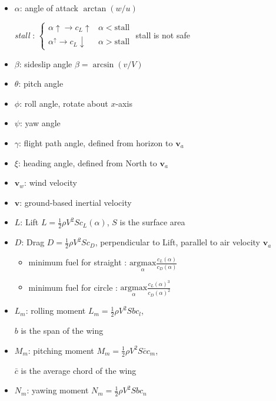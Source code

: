 \documentclass[landscape,a0paper,fontscale=0.285]{baposter} %
\newcommand{\compresslist}{ %
\setlength{\itemsep}{1pt}
\setlength{\parskip}{0pt}
\setlength{\parsep}{0pt}
}
\newcommand{\atan}{\arctan}
\newcommand{\asin}{\arcsin}
\begin{document}
\begin{poster}
{\begin{itemize}
    \item $\alpha$: angle of attack $\atan(w/u)$
    
    \textit{stall} : $\begin{cases}\alpha\uparrow \to c_L\uparrow & \alpha <\text{stall} \\ \alpha^\uparrow  \to c_L\downarrow & \alpha > \text{stall}\end{cases}$ stall is not safe
    \item $\beta$: sideslip angle $\beta = \asin(v/V)$
    \item $\theta$: pitch angle
    \item $\phi$: roll angle, rotate about $x$-axis
    \item $\psi$: yaw angle
    \item $\gamma$: flight path angle, defined from horizon to $\mathbf{v}_a$
    \item $\xi$: heading angle, defined from North to $\mathbf{v}_a$
    \item $\mathbf{v}_w$: wind velocity
    \item $\mathbf{v}$: ground-based inertial velocity
    \item $L$: Lift $L=\frac{1}{2}\rho V^2 S{c_L}(\alpha)$, $S$ is the surface area
    \item $D$: Drag $D=\frac{1}{2}\rho V^2 S{c_D}$, perpendicular to Lift, parallel to air velocity $\mathbf{v}_a$
    \begin{itemize}[label=$\circ$]\compresslist
        \item minimum fuel for straight : $\underset{\alpha}{\text{argmax}}\frac{c_L(\alpha)}{c_D(\alpha)}$
        \item minimum fuel for circle : $\underset{\alpha}{\text{argmax}}\frac{c_L(\alpha)^3}{c_D(\alpha)^2}$
    \end{itemize}
    \item $L_m$: rolling moment $L_m = \frac{1}{2}\rho V^2 S{bc_l}$, 
    
    $b$ is the span of the wing
    \item $M_m$: pitching moment $M_m = \frac{1}{2}\rho V^2 S{\bar cc_m}$, 
    
    $\bar c$ is the average chord of the wing
    \item $N_m$: yawing moment $N_m = \frac{1}{2}\rho V^2 S{bc_n}$
\end{itemize}

}
\end{poster}
\end{document}
